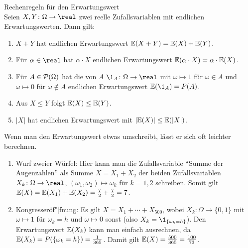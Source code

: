 \linie

\begin{Satz}{Rechenregeln für den Erwartungswert}\\
    Seien $X, Y\colon \Omega \rightarrow \real$ zwei reelle Zufallsvariablen mit endlichen
    Erwartungswerten.
    Dann gilt:
    \begin{enumerate}
        \item
        $X + Y$ hat endlichen Erwartungswert $\EW(X + Y) = \EW(X) + \EW(Y)$.

        \item
        Für $\alpha \in \real$ hat
        $\alpha \cdot X$ endlichen Erwartungswert $\EW(\alpha \cdot X) = \alpha \cdot \EW(X)$.

        \item
        Für $A \in \P(\Omega)$ hat die  von $A$
        $\1_A\colon \Omega \rightarrow \real$ mit $\omega \mapsto 1$ für $\omega \in A$ und
        $\omega \mapsto 0$ für $\omega \notin A$ endlichen Erwartungswert $\EW(\1_A) = P(A)$.

        \item
        Aus $X \le Y$ folgt $\EW(X) \le \EW(Y)$.

        \item
        $|X|$ hat endlichen Erwartungswert mit $|\EW(X)| \le \EW(|X|)$.
    \end{enumerate}
\end{Satz}

\begin{Bsp}
    Wenn man den Erwartungswert etwas umschreibt, lässt er sich oft leichter berechnen.
    \begin{enumerate}
        \item
        Wurf zweier Würfel:
        Hier kann man die Zufallsvariable "`Summe der Augenzahlen"' als Summe $X = X_1 + X_2$
        der beiden Zufallsvariablen $X_k\colon \Omega \rightarrow \real$,
        $(\omega_1, \omega_2) \mapsto \omega_k$ für $k = 1, 2$ schreiben.
        Somit gilt $\EW(X) = \EW(X_1) + \EW(X_2) = \frac{7}{2} + \frac{7}{2} = 7$.

        \item
        Kongresseröf"|fnung:
        Es gilt $X = X_1 + \dotsb + X_{500}$, wobei
        $X_k\colon \Omega \rightarrow \{0, 1\}$ mit $\omega \mapsto 1$ für $\omega_k = h$
        und $\omega \mapsto 0$ sonst (also $X_k = \1_{\{\omega_k = h\}}$).
        Den Erwartungswert $\EW(X_k)$ kann man einfach ausrechnen,
        da $\EW(X_k) = P(\{\omega_k = h\}) = \frac{1}{365}$.
        Damit gilt $\EW(X) = \frac{500}{365} = \frac{100}{73}$.
    \end{enumerate}
\end{Bsp}

